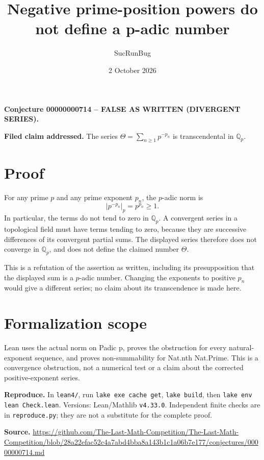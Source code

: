 \documentclass[11pt]{article}
\title{Negative prime-position powers do not define a p-adic number}
\author{SucRunBug}
\date{2 October 2026}
\begin{document}
\maketitle
\textbf{Conjecture 00000000714 -- FALSE AS WRITTEN (DIVERGENT SERIES).}

\textbf{Filed claim addressed.} The series $\Theta=\sum_{n\ge1}p^{-p_n}$ is transcendental in $\mathbb Q_p$.

\section*{Proof}
For any prime $p$ and any prime exponent $p_n$, the $p$-adic norm is
\[|p^{-p_n}|_p=p^{p_n}\ge1.\]
In particular, the terms do not tend to zero in $\mathbb Q_p$. A convergent series in a topological field must have terms tending to zero, because they are successive differences of its convergent partial sums. The displayed series therefore does not converge in $\mathbb Q_p$, and does not define the claimed number $\Theta$.

This is a refutation of the assertion as written, including its presupposition that the displayed sum is a $p$-adic number. Changing the exponents to positive $p_n$ would give a different series; no claim about its transcendence is made here.

\section*{Formalization scope}
Lean uses the actual norm on Padic p, proves the obstruction for every natural-exponent sequence, and proves non-summability for Nat.nth Nat.Prime. This is a convergence obstruction, not a numerical test or a claim about the corrected positive-exponent series.

\textbf{Reproduce.} In \texttt{lean4/}, run \texttt{lake exe cache get},
\texttt{lake build}, then \texttt{lake env lean Check.lean}. Versions:
Lean/Mathlib \texttt{v4.33.0}. Independent finite checks are in
\texttt{reproduce.py}; they are not a substitute for the complete proof.

\textbf{Source.} \url{https://github.com/The-Last-Math-Competition/The-Last-Math-Competition/blob/28a22efac52c4a7abd4bba8a143b1c1a06b7e177/conjectures/00000000714.md}
\end{document}
